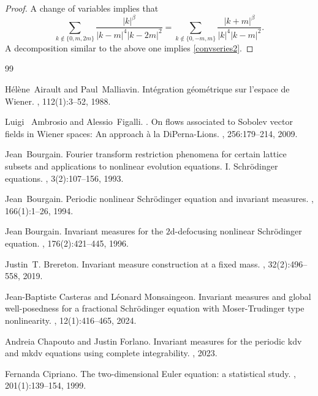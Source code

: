 \documentclass[11pt,leqno]{amsart}
\begin{document}
\begin{proof}
A  change of variables implies that
$$\sum_{k\not\in \{  0, m, 2m\} } \dfrac{|k|^{\beta}}{|k-m|^4 |k-2m|^2} = \sum_{k\not\in \{ 0, -m,m\}  } \frac{|k+m|^\beta}{|k|^4 |k-m|^2}.$$
A decomposition similar to the above one  implies \eqref{convseries2}.  
\end{proof}



\begin{thebibliography}{99}

H\' el\` ene~Airault and Paul~Malliavin.
\newblock Int\'egration g\'eom\'etrique sur l'espace de {W}iener.
, 112(1):3--52, 1988.

Luigi ~Ambrosio and Alessio~Figalli.
\newblock. On flows associated to Sobolev vector fields in Wiener spaces: An approach \`a la DiPerna-Lions.
, 256:179--214, 2009.

Jean~Bourgain.
\newblock Fourier transform restriction phenomena for certain lattice subsets
  and applications to nonlinear evolution equations. {I}. {S}chr\"odinger
  equations.
, 3(2):107--156, 1993.

Jean~Bourgain.
\newblock Periodic nonlinear {S}chr\"odinger equation and invariant measures.
, 166(1):1--26, 1994.

Jean Bourgain.
\newblock Invariant measures for the {$2$}d-defocusing nonlinear
  {S}chr\"odinger equation.
, 176(2):421--445, 1996.

Justin~T. Brereton.
\newblock Invariant measure construction at a fixed mass.
, 32(2):496--558, 2019.

Jean-Baptiste Casteras and L\'eonard Monsaingeon.
\newblock Invariant measures and global well-posedness for a fractional
  {S}chr\"odinger equation with {M}oser-{T}rudinger type nonlinearity.
, 12(1):416--465,
  2024.

Andreia Chapouto and Justin Forlano.
\newblock Invariant measures for the periodic kdv and mkdv equations using
  complete integrability.
, 2023.

Fernanda Cipriano.
\newblock The two-dimensional {E}uler equation: a statistical study.
, 201(1):139--154, 1999.


\end{thebibliography}
\end{document}
